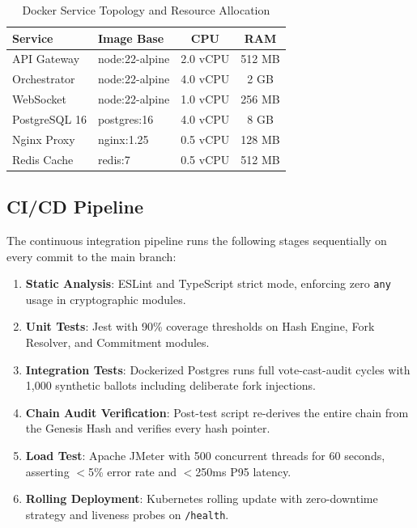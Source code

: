 \documentclass[journal,10pt,twocolumn]{IEEEtran}
\begin{document}
\begin{table}[htbp]
\caption{Docker Service Topology and Resource Allocation}
\label{tab:deployment}
\centering
\small
{}
\begin{tabularx}{\linewidth}{@{}lXcc@{}}
\toprule
\textbf{Service} & \textbf{Image Base} & \textbf{CPU} & \textbf{RAM} \\
\midrule
API Gateway & node:22-alpine & 2.0 vCPU & 512 MB \\
Orchestrator & node:22-alpine & 4.0 vCPU & 2 GB \\
WebSocket & node:22-alpine & 1.0 vCPU & 256 MB \\
PostgreSQL 16 & postgres:16 & 4.0 vCPU & 8 GB \\
Nginx Proxy & nginx:1.25 & 0.5 vCPU & 128 MB \\
Redis Cache & redis:7 & 0.5 vCPU & 512 MB \\
\bottomrule
\end{tabularx}
\end{table}

\subsection{CI/CD Pipeline}

The continuous integration pipeline runs the following stages sequentially on every commit to the main branch:

\begin{enumerate}
    \item \textbf{Static Analysis}: ESLint and TypeScript strict mode, enforcing zero \texttt{any} usage in cryptographic modules.
    \item \textbf{Unit Tests}: Jest with 90\% coverage thresholds on Hash Engine, Fork Resolver, and Commitment modules.
    \item \textbf{Integration Tests}: Dockerized Postgres runs full vote-cast-audit cycles with 1,000 synthetic ballots including deliberate fork injections.
    \item \textbf{Chain Audit Verification}: Post-test script re-derives the entire chain from the Genesis Hash and verifies every hash pointer.
    \item \textbf{Load Test}: Apache JMeter with 500 concurrent threads for 60 seconds, asserting $<$5\% error rate and $<$250ms P95 latency.
    \item \textbf{Rolling Deployment}: Kubernetes rolling update with zero-downtime strategy and liveness probes on \texttt{/health}.
\end{enumerate}
\end{document}
